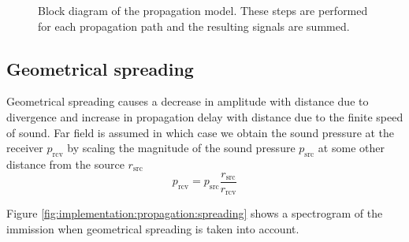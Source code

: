 \begin{figure}[H]
  \centering
{}
  \caption{Block diagram of the propagation model. These steps are performed for each propagation path and the resulting signals are summed.}
  \label{fig:propagation_block_diagram}
\end{figure}

\subsection{Geometrical spreading}
Geometrical spreading causes a decrease in amplitude with distance due to divergence and increase
in propagation delay with distance due to the finite speed of sound. Far field
is assumed in which case we obtain the sound pressure at the receiver $p_{\mathrm{rcv}}$
by scaling the magnitude of the sound pressure $p_{\mathrm{src}}$ at some other distance
from the source $r_{\mathrm{src}}$
\begin{equation}
 p_{\mathrm{rcv}} = p_{\mathrm{src}} \frac{r_{\mathrm{src}}}{r_{\mathrm{rcv}}}
\end{equation}

Figure \ref{fig:implementation:propagation:spreading} shows a spectrogram of the
immission when geometrical spreading is taken into account.

